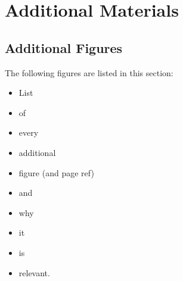 \chapter{Additional Materials}
\label{ch:additional-materials}

\cleardoublepage



\clearpage

\section{Additional Figures}

The following figures are listed in this section:

\begin{itemize}
  \item List
  \item of
  \item every
  \item additional
  \item figure (and page ref)
  \item and
  \item why
  \item it
  \item is
  \item relevant.
\end{itemize}

